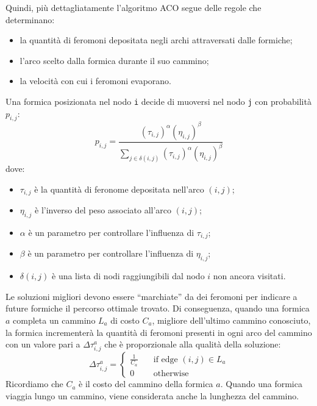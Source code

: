 Quindi, più dettagliatamente l'algoritmo ACO segue delle regole che determinano:
\begin{itemize}
    \item la quantità di feromoni depositata negli archi attraversati dalle formiche;
    \item l'arco scelto dalla formica durante il suo cammino;
    \item la velocità con cui i feromoni evaporano.
\end{itemize}
Una formica posizionata nel nodo \texttt{i} decide di muoversi nel nodo \texttt{j} con probabilità $p_{i,j}$:
\begin{equation} \label{aco:prob}
     p_{i,j} = \frac{{(\tau_{i,j})}^{\alpha}{(\eta_{i,j})}^\beta}{\sum_{j \in \delta(i,j)}{(\tau_{i,j})}^{\alpha}{(\eta_{i,j})}^\beta}
\end{equation} 
dove:
\begin{itemize}
    \item $\tau_{i,j}$ è la quantità di feronome depositata nell'arco $(i,j)$;
    \item $\eta_{i,j}$ è l'inverso del peso associato all'arco $(i,j)$;
    \item $\alpha$ è un parametro per controllare l'influenza di $\tau_{i,j}$;
    \item $\beta$ è un parametro per controllare l'influenza di $\eta_{i,j}$;
    \item $\delta(i,j)$ è una lista di nodi raggiungibili dal nodo $i$ non ancora visitati.
\end{itemize}
Le soluzioni migliori devono essere ``marchiate'' da dei feromoni per indicare a future formiche il percorso ottimale trovato.
Di conseguenza, quando una formica $a$ completa un cammino $L_a$ di costo $C_a$, 
migliore dell'ultimo cammino conosciuto, la formica incrementerà la quantità di 
feromoni presenti in ogni arco del cammino con un valore pari a $\Delta\tau_{i,j}^a$ che è proporzionale alla qualità della soluzione:
\begin{equation} \label{aco:delta}
 \Delta\tau_{i,j}^a = 
    \begin{cases}
    {\frac{1}{C_a}}       & \quad \text{if edge } (i,j) \in L_a\\
    0                     & \quad \text{otherwise}
    \end{cases}
\end{equation}
Ricordiamo che $C_a$ è il costo del cammino della formica $a$. 
Quando una formica viaggia lungo un cammino, viene considerata anche la lunghezza del cammino. 

